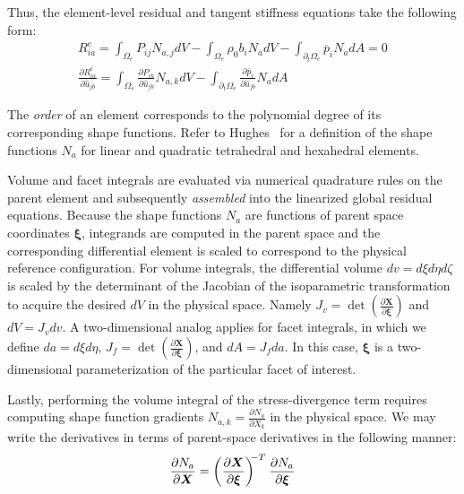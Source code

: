 Thus, the element-level residual and tangent stiffness equations take the following form:
\begin{gather}
R^e_{ia} = \int_{\Omega_e}P_{ij}N_{a,j}dV - \int_{\Omega_e}\rho_0b_iN_adV - \int_{\partial_t\Omega_e} \overline{p}_iN_adA = 0 \label{eqn:elr} \\[0.7em]
\frac{\partial R^e_{ia}}{\partial \hat{u}_{jb}} = \int_{\Omega_e}\frac{\partial P_{ik}}{\partial \hat{u}_{jb}}N_{a,k}dV - \int_{\partial_t\Omega_e}\frac{\partial \overline{p}_i}{\partial \hat{u}_{jb}}N_adA \label{eqn:elt}
\end{gather}

The \textit{order} of an element corresponds to the polynomial degree of its corresponding shape functions. Refer to Hughes~\cite{hughes_2007} for a definition of the shape functions $N_a$ for linear and quadratic tetrahedral and hexahedral elements. 

Volume and facet integrals are evaluated via numerical quadrature rules on the parent element and subsequently \textit{assembled} into the linearized global residual equations. Because the shape functions $N_a$ are functions of parent space coordinates $\bm{\xi}$, integrands are computed in the parent space and the corresponding differential element is scaled to correspond to the physical reference configuration. For volume integrals, the differential volume $dv = {d\xi}{d\eta}{d\zeta}$ is scaled by the determinant of the Jacobian of the isoparametric transformation to acquire the desired $dV$ in the physical space. Namely $J_v = \det(\frac{\partial{\bm{X}}}{\partial\bm{\xi}})$ and $dV = J_vdv$. A two-dimensional analog applies for facet integrals, in which we define $da = {d\xi}{d\eta}$, $J_f = \det(\frac{\partial{\bm{X}}}{\partial\bm{\xi}})$, and $dA = J_fda$. In this case, $\bm{\xi}$ is a two-dimensional parameterization of the particular facet of interest.

Lastly, performing the volume integral of the stress-divergence term requires computing shape function gradients $N_{a,k} = \frac{\partial N_a}{\partial X_k}$ in the physical space. We may write the derivatives in terms of parent-space derivatives in the following manner:
\begin{equation}
\frac{\partial N_a}{\partial \bm{X}} = \left(\frac{\partial \bm{X}}{\partial \bm{\xi}}\right)^{\hspace{-0.3em}-T} \hspace{0.05em} \frac{\partial N_a}{\partial \bm{\xi}}
\end{equation}

